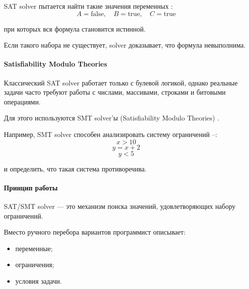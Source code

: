  SAT solver пытается найти такие значения переменных :
 \begin{equation}
 	A = \mathrm{false},\quad B = \mathrm{true},\quad C = \mathrm{true}
 	\label{eq:sat-values}
 \end{equation}

 при которых вся формула становится истинной.

 Если такого набора не существует, solver доказывает, что формула
 невыполнима.

 \paragraph{Satisfiability Modulo Theories}

 Классический SAT solver работает только с булевой логикой, однако реальные задачи часто требуют работы с числами, массивами, строками и битовыми операциями.

 Для этого используются SMT solver'ы (Satisfiability Modulo Theories) \cite{z3:github}.

 Например, SMT solver способен анализировать систему ограничений --:
 \begin{equation}
 	x > 10
 	\label{eq:smt-x}
 \end{equation}
 \begin{equation}
 	y = x + 2
 	\label{eq:smt-y-def}
 \end{equation}
 \begin{equation}
 	y < 5
 	\label{eq:smt-y-max}
 \end{equation}

 и определить, что такая система противоречива.

 \paragraph{Принцип работы}

 SAT/SMT solver --- это механизм поиска значений, удовлетворяющих набору ограничений.

 Вместо ручного перебора вариантов программист описывает:

 \begin{itemize}
 	\item переменные;
 	\item ограничения;
 	\item условия задачи.
 \end{itemize}

